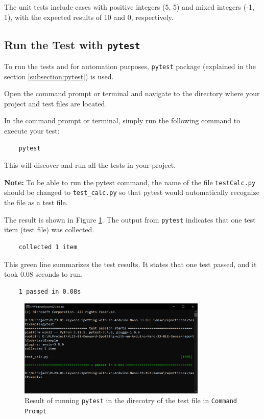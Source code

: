 The unit tests include cases with positive integers (5, 5) and mixed integers (-1, 1), with the expected results of 10 and 0, respectively.

\subsection{Run the Test with \texttt{pytest}}

To run the tests and for automation purposes, \texttt{pytest} package (explained in the section \ref{subsection:pytest}) is used.

Open the command prompt or terminal and navigate to the directory where your project and test files are located.

In the command prompt or terminal, simply run the following command to execute your test:

\begin{verbatim}
	pytest
\end{verbatim}

This will discover and run all the tests in your project.

\textbf{Note:} To be able to run the pytest command, the name of the file \texttt{testCalc.py} should be changed to \texttt{test\_calc.py} so that pytest would automatically recognize the file as a test file.

The result is shown in Figure \ref{fig:pytestExampleResult}. The output from \texttt{pytest} indicates that one test item (test file) was collected.

\begin{verbatim}
	collected 1 item
\end{verbatim}

This green line summarizes the test results. It states that one test passed, and it took 0.08 seconds to run.

\begin{verbatim}
	1 passed in 0.08s
\end{verbatim}


\begin{figure}[h!]
	\centering
	\includegraphics[width=0.8\textwidth]{Images/testSoftware/pytestExampleResult}
	\caption{Result of running \texttt{pytest} in the direcotry of the test file in \texttt{Command Prompt}} 
	\label{fig:pytestExampleResult}
\end{figure}


